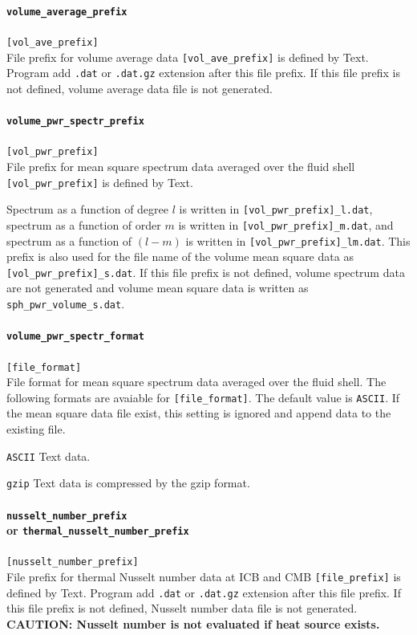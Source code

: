\paragraph{\tt volume\_average\_prefix}
\label{href_t:volume_average_prefix}
\verb|[vol_ave_prefix]| \\
File prefix for volume average data \verb|[vol_ave_prefix]| is defined by Text. Program add {\tt .dat} or {\tt .dat.gz} extension after this file prefix. If this file prefix is not defined, volume average data file is not generated. 

\paragraph{\tt volume\_pwr\_spectr\_prefix}
\label{href_t:volume_pwr_spectr_prefix}
\verb|[vol_pwr_prefix]| \\
File prefix for mean square spectrum data averaged over the fluid shell \verb|[vol_pwr_prefix]| is defined by Text. 

Spectrum as a function of degree $l$ is written in \verb|[vol_pwr_prefix]_l.dat|, spectrum as a function of order $m$ is written in \verb|[vol_pwr_prefix]_m.dat|, and spectrum as a function of $(l-m)$ is written in \verb|[vol_pwr_prefix]_lm.dat|. This prefix is also used for the file name of the volume mean square data as \verb|[vol_pwr_prefix]_s.dat|.
If this file prefix is not defined, volume spectrum data are not generated and volume mean square data is written as \verb|sph_pwr_volume_s.dat|.

\paragraph{\tt volume\_pwr\_spectr\_format}
\label{href_t:volume_pwr_spectr_format}
\verb|[file_format]| \\
File format for mean square spectrum data averaged over the fluid shell. The following formats are avaiable for \verb|[file_format]|. The default value is \verb|ASCII|. If the mean square data file exist, this setting is ignored and append data to the existing file.
%
\begin{description}
\item{\tt ASCII}   Text data.
\item{\tt gzip}    Text data is compressed by the gzip format.
\end{description}
%

\paragraph{{\tt nusselt\_number\_prefix} \\
or {\tt thermal\_nusselt\_number\_prefix}}
\label{href_t:nusselt_number_prefix}
\verb|[nusselt_number_prefix]| \\
File prefix for thermal Nusselt number data at ICB and CMB \verb|[file_prefix]| is defined by Text. Program add {\tt .dat} or {\tt .dat.gz} extension after this file prefix. If this file prefix is not defined, Nusselt number data file is not generated. \\
{\bf CAUTION: Nusselt number is not evaluated if heat source exists.}


